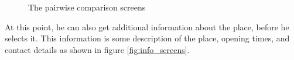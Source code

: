 \documentclass[11pt,a4paper,oneside]{article}
\begin{document}
\begin{figure}[H]
    \centering
    \qquad
    \caption{The pairwise comparison screens }%
    \label{fig:pairwise_comparison_screens}%
\end{figure}

At this point, he can also get additional information about the place, before he selects it. This information is some description of the place, opening times, and contact details as shown in figure \ref{fig:info_screens}.
\end{document}
